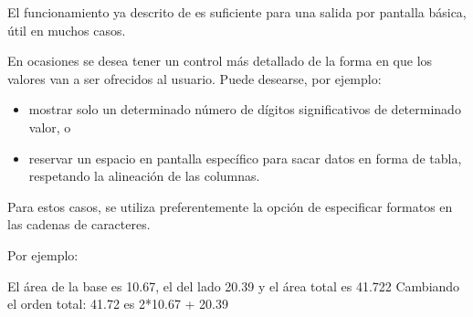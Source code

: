 \documentclass[letterpaper,10pt,english]{sphinxmanual}
\begin{document}
El funcionamiento ya descrito de  es suficiente para una salida por pantalla básica, útil en muchos casos.

En ocasiones se desea tener un control más detallado de la forma en que los valores van a ser ofrecidos al usuario. Puede desearse, por ejemplo:
\begin{itemize}
\item {} 
mostrar solo un determinado número de dígitos significativos de determinado valor, o

\item {} 
reservar un espacio en pantalla específico para sacar datos en forma de tabla, respetando la alineación de las columnas.

\end{itemize}

Para estos casos, se utiliza preferentemente la opción de especificar formatos en las cadenas de caracteres.

Por ejemplo:

\begin{sphinxVerbatim}[commandchars=\\\{\}]
  
  
    

\end{sphinxVerbatim}

\begin{sphinxVerbatim}[commandchars=\\\{\}]
El área de la base es 10.67, el del lado 20.39 y el área total es 41.722
Cambiando el orden total: 41.72 es 2*10.67 + 20.39
\end{sphinxVerbatim}
\end{document}
